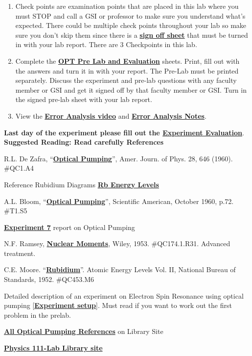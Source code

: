 \documentclass{../lab}
\newcommand{\OPTPrelabAndEvaluation}{http://experimentationlab.berkeley.edu/optprelab}
\newcommand{\SignOffSheet}{http://experimentationlab.berkeley.edu/optcheckpoints}
\newcommand{\OpticalPumpingZafra}{http://physics111.lib.berkeley.edu/Physics111/Reprints/OPT/05-Optical_Pumping-DeZafra.pdf}
\newcommand{\RbEnergyLevels}{http://experimentationlab.berkeley.edu/sites/default/files/images/OPT_RbEnergyLevels.pdf}
\newcommand{\OpticalPumpingBloom}{http://physics111.lib.berkeley.edu/Physics111/Reprints/OPT/02-Optical_Pumping-Bloom.pdf}
\newcommand{\ExperimentSeven}{http://physics111.lib.berkeley.edu/Physics111/Reprints/OPT/06-Experiment_7.pdf}
\newcommand{\NuclearMoments}{http://physics111.lib.berkeley.edu/Physics111/Reprints/OPT/04-Nuclear_Moments.pdf}
\newcommand{\Rubidium}{http://physics111.lib.berkeley.edu/Physics111/Reprints/OPT/OPT\%20Rubidium.pdf}
\newcommand{\OPTReprints}{http://physics111.lib.berkeley.edu/Physics111/Reprints/OPT/OPT_index.html}
\begin{document}
\begin{enumerate}
    \item Check points are examination points that are placed in this lab where you must STOP and call a GSI or professor to make sure you understand what's expected. There could  be multiple check points throughout your lab so make sure you don't skip them since there is a \href{\SignOffSheet}{\textbf{sign off sheet}} that must be turned in with your lab report. There are 3 Checkpoints in this lab.

    \item Complete the \href{\OPTPrelabAndEvaluation}{\textbf{OPT Pre Lab and Evaluation}} sheets. Print,  fill out with the answers and turn it in with your report. The Pre-Lab must be printed separately. Discuss the experiment and pre-lab questions with any faculty member or GSI and get it signed off by that faculty member or GSI. Turn in the signed pre-lab sheet with your lab report.

    \item View the \href{\ErrorAnalysisVideo}{\textbf{Error Analysis video}} and \href{\ErrorAnalysisNotes}{\textbf{Error Analysis Notes}}.
\end{enumerate}

\noindent\textbf{Last day of the experiment please fill out the \href{\ExperimentEvaluation}{\textbf{Experiment Evaluation}}}. \\

\noindent\textbf{Suggested Reading: Read carefully References \cite{Zafra,RbDiagrams,Bloom,ExperimentSeven}}
\begin{thebibliography}{}
R.L. De Zafra, ``\href{\OpticalPumpingZafra}{\textbf{Optical Pumping}}'', Amer. Journ. of Phys. 28, 646 (1960). \#QC1.A4

Reference Rubidium Diagrams \href{\RbEnergyLevels}{\textbf{Rb Energy Levels}}

A.L. Bloom, ``\href{\OpticalPumpingBloom}{\textbf{Optical Pumping}}'', Scientific American, October 1960, p.72. \#T1.S5

\href{\ExperimentSeven}{\textbf{Experiment 7}} report on Optical Pumping

N.F. Ramsey, \href{\NuclearMoments}{\textbf{Nuclear Moments}}, Wiley, 1953. \#QC174.1.R31. Advanced treatment.

C.E. Moore. ``\href{\Rubidium}{\textbf{Rubidium}}''. Atomic Energy Levels Vol. II, National Bureau of Standards, 1952. \#QC453.M6

Detailed description of an experiment on Electron Spin Resonance using optical pumping [\href{\ExperimentSeven}{\textbf{Experiment setup}}]. Must read if you want to work out the first problem in the prelab.

\href{\OPTReprints}{\textbf{All Optical Pumping References}} on Library Site

\href{\LabReprints}{\textbf{Physics 111-Lab Library site}}
\end{thebibliography}
\end{document}
